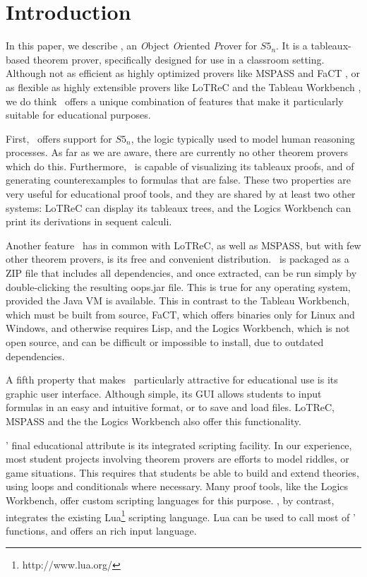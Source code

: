\section{Introduction}
\label{sec:introduction}

In this paper, we describe \oops, an {\it O}bject {\it O}riented {\it P}rover
for $S5_n$.
It is a tableaux-based theorem prover, specifically designed for use in a
classroom setting.
Although not as efficient as highly optimized provers like MSPASS
\citep{mspass2000} and FaCT \citep{fact1998}, or as flexible as highly
extensible provers like LoTReC \citep{lotrec2005} and the Tableau Workbench
\citep{twb2009}, we do think \oops\ offers a unique combination of features
that make it particularly suitable for educational purposes.

First, \oops\ offers support for $S5_n$, the logic typically used to model
human reasoning processes.
As far as we are aware, there are currently no other theorem provers which do
this.
Furthermore, \oops\ is capable of visualizing its tableaux proofs, and of
generating counterexamples to formulas that are false.
These two properties are very useful for educational proof tools, and they are
shared by at least two other systems: LoTReC can display its tableaux trees,
and the Logics Workbench \citep{heuerding1996} can print its derivations in
sequent calculi.

Another feature \oops\ has in common with LoTReC, as well as MSPASS, but with
few other theorem provers, is its free and convenient distribution.
\oops\ is packaged as a ZIP file that includes all dependencies, and once
extracted, can be run simply by double-clicking the resulting oops.jar file.
This is true for any operating system, provided the Java VM is available.
This in contrast to the Tableau Workbench, which must be built from source,
FaCT, which offers binaries only for Linux and Windows, and otherwise requires
Lisp, and the Logics Workbench, which is not open source, and can be difficult
or impossible to install, due to outdated dependencies.

A fifth property that makes \oops\ particularly attractive for educational use
is its graphic user interface.
Although simple, its GUI allows students to input formulas in an easy and
intuitive format, or to save and load files.
LoTReC, MSPASS and the the Logics Workbench also offer this functionality.

\oops' final educational attribute is its integrated scripting facility.
In our experience, most student projects involving theorem provers are efforts
to model riddles, or game situations.
This requires that students be able to build and extend theories, using loops
and conditionals where necessary.
Many proof tools, like the Logics Workbench, offer custom scripting languages
for this purpose.
\oops, by contrast, integrates the existing Lua\footnote{http://www.lua.org/}
scripting language.
Lua can be used to call most of \oops' functions, and offers an  rich input
language.

